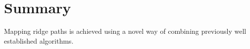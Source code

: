 \chapter{Summary}
\label{chap:summary}


\bit
\item Mapping ridge paths is achieved using a novel way of combining previously well established  algorithms.
\item \expand
\eit

\placeholder


